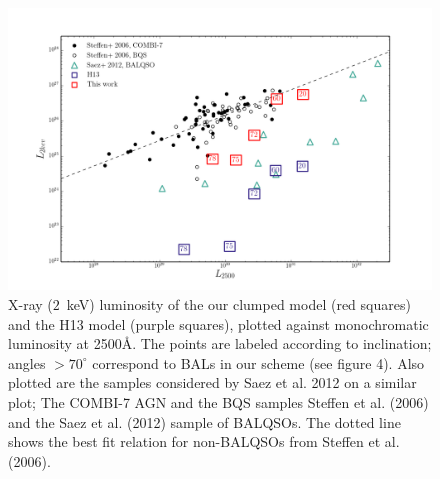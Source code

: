 \documentclass[useAMS,usenatbib]{mn2e_x}
\begin{document}
\begin{figure} %
\centering
\includegraphics[width=1.0\textwidth]{figures/lx.png}
\caption
{
X-ray ($2$~keV) luminosity of the our clumped model (red squares) 
and the H13 model (purple squares), plotted against monochromatic luminosity 
at 2500\AA. The points are labeled according to inclination; angles
$>70^\circ$ correspond to BALs in our scheme (see figure 4).
Also plotted are the samples considered by Saez et al. 2012 on a similar plot; 
The COMBI-7 AGN and the BQS samples Steffen et al. (2006) and the Saez et al. (2012) 
sample of BALQSOs. The dotted line shows the best fit relation for non-BALQSOs 
from Steffen et al. (2006).
}
\label{fig:xray}
\end{figure} %

\begin{figure}
\end{figure}
\end{document}
